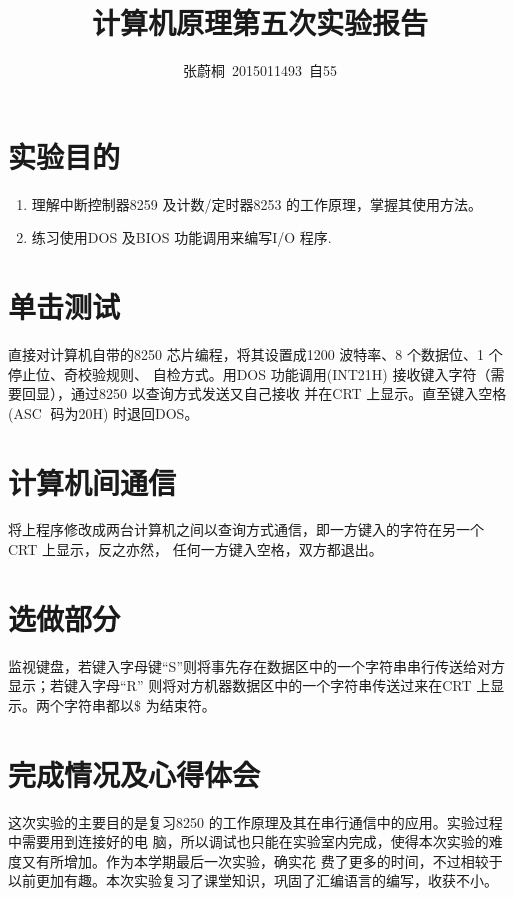 \documentclass[UTF8,a4paper]{paper}
\title{计算机原理第五次实验报告}
\author{张蔚桐\ 2015011493\ 自55}
\begin{document}
\maketitle
\section{实验目的}
\begin{enumerate}
\item 理解中断控制器8259 及计数/定时器8253 的工作原理，掌握其使用方法。
\item 练习使用DOS 及BIOS 功能调用来编写I/O 程序.
\end{enumerate}
\section{单击测试}
直接对计算机自带的8250 芯片编程，将其设置成1200 波特率、8 个数据位、1 个停止位、奇校验规则、
自检方式。用DOS 功能调用(INT21H) 接收键入字符（需要回显），通过8250 以查询方式发送又自己接收
并在CRT 上显示。直至键入空格(ASC￿ 码为20H) 时退回DOS。\\ 


\section{计算机间通信}
将上程序修改成两台计算机之间以查询方式通信，即一方键入的字符在另一个CRT 上显示，反之亦然，
任何一方键入空格，双方都退出。\\ 


\section{选做部分}
监视键盘，若键入字母键“S”则将事先存在数据区中的一个字符串串行传送给对方显示；若键入字母“R”
则将对方机器数据区中的一个字符串传送过来在CRT 上显示。两个字符串都以\$ 为结束符。\\ 


\section{完成情况及心得体会}
这次实验的主要目的是复习8250 的工作原理及其在串行通信中的应用。实验过程中需要用到连接好的电
脑，所以调试也只能在实验室内完成，使得本次实验的难度又有所增加。作为本学期最后一次实验，确实花
费了更多的时间，不过相较于以前更加有趣。本次实验复习了课堂知识，巩固了汇编语言的编写，收获不小。
\end{document}

